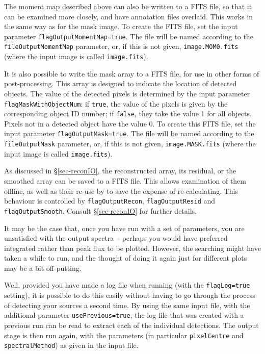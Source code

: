 

The moment map described above can also be written to a FITS file, so
that it can be examined more closely, and have annotation files
overlaid. This works in the same way as for the mask image. To create
the FITS file, set the input parameter
\texttt{flagOutputMomentMap=true}. The file will be named according to
the \texttt{fileOutputMomentMap} parameter, or, if this is not given,
\texttt{image.MOM0.fits} (where the input image is called
\texttt{image.fits}).

\label{sec-maskOut}

It is also possible to write the mask array to a FITS file, for use in
other forms of post-processing. This array is designed to indicate the
location of detected objects. The value of the detected pixels is
determined by the input parameter \texttt{flagMaskWithObjectNum}: if
\texttt{true}, the value of the pixels is given by the corresponding
object ID number; if \texttt{false}, they take the value 1 for all
objects. Pixels not in a detected object have the value 0. To create
this FITS file, set the input parameter
\texttt{flagOutputMask=true}. The file will be named according to the
\texttt{fileOutputMask} parameter, or, if this is not given,
\texttt{image.MASK.fits} (where the input image is called
\texttt{image.fits}).

\label{sec-reconOut}

As discussed in \S\ref{sec-reconIO}, the reconstructed array, its
residual, or the smoothed array can be saved to a FITS file. This
allows examination of them offline, as well as their re-use by
\duchamp to save the expense of re-calculating. This behaviour is
controlled by \texttt{flagOutputRecon}, \texttt{flagOutputResid} and
\texttt{flagOutputSmooth}. Consult \S\ref{sec-reconIO} for further
details.

\label{sec-reuse}

It may be the case that, once you have run \duchamp with a set of
parameters, you are unsatisfied with the output spectra -- perhaps you
would have preferred integrated rather than peak flux to be
plotted. However, the searching might have taken a while to run, and
the thought of doing it again just for different plots may be a bit
off-putting.

Well, provided you have made a log file when running \duchamp (with
the \texttt{flagLog=true} setting), it is possible to do this easily
without having to go through the process of detecting your sources a
second time. By using the same input file, with the additional
parameter \texttt{usePrevious=true}, the log file that was created
with a previous \duchamp run can be read to extract each of the
individual detections. The output stage is then run again, with the
parameters (in particular \texttt{pixelCentre} and
\texttt{spectralMethod}) as given in the input file. 

